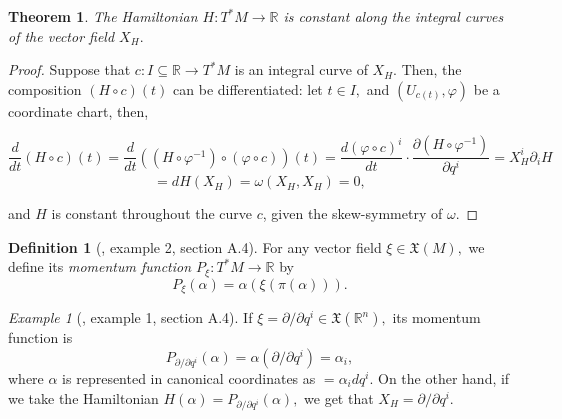 \documentclass[12pt, letterpaper, reqno]{amsart}
\theoremstyle{definition}
\newtheorem{df}{Definition}
\theoremstyle{plain}
\newtheorem{thm}{Theorem}
\theoremstyle{remark}
\newtheorem{ex}{Example}
\begin{document}
\begin{thm}\label{thm:constantCurves}
The Hamiltonian $ H: T^*M \rightarrow \mathbb{R} $ is constant along the integral curves of the vector field $ X_H. $ 	
\end{thm}

\begin{proof}
	Suppose that $ c:I\subseteq \mathbb{R} \rightarrow T^*M $ is an integral curve of $ X_H. $ Then, the composition $ (H\circ c) (t) $ can be differentiated: let $ t\in I, $ and $ (U_{c(t)}, \varphi) $ be a coordinate chart, then, 
		
	$$ \frac{d}{dt} (H\circ c)(t) = \frac{d}{dt} \left( \left( H\circ \varphi^{-1} \right)\circ \left( \varphi\circ c \right) \right)(t) = \frac{d(\varphi\circ c)^i}{dt}\cdot \frac{\partial (H\circ \varphi^{-1})}{\partial q^i}= X_H^i \partial_i H $$ $$= dH(X_H)=\omega(X_H, X_H)=0,$$    

	and $ H $ is constant throughout the curve $ c $, given the skew-symmetry of $ \omega $. 
\end{proof}

\begin{df}[\cite{montgomery2002tour}, example 2, section A.4]
	For any vector field $ \xi\in \mathfrak{X}(M), $ we define its \textit{ momentum function $ P_\xi:T^*M \rightarrow \mathbb{R} $} by
	$$ P_\xi(\alpha)= \alpha(\xi(\pi(\alpha))). $$ 
\end{df}

\begin{ex}[\cite{montgomery2002tour}, example 1, section A.4]
	If $ \xi=\partial/\partial q^i\in \mathfrak{X}( \mathbb{R}^n), $ its momentum function is
	$$ P_{\partial/\partial q^i}(\alpha)=\alpha(\partial/\partial q^i) = \alpha_i, $$ 
	where $ \alpha$ is represented in canonical coordinates as $= \alpha_i dq^i $. On the other hand, if we take the Hamiltonian $ H(\alpha)=P_{\partial/\partial q^i}(\alpha), $ we get that $ X_H=\partial /\partial q^i. $ 
\end{ex}
\end{document}
